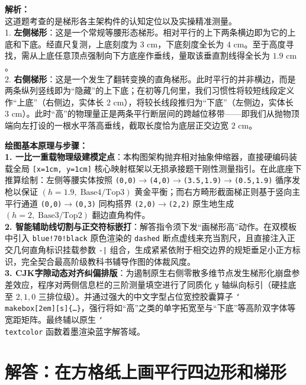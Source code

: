 {\small\color{gray}
\textbf{解析：}\\
这道题考查的是梯形各主架构件的认知定位以及实操精准测量。\\
1. \textbf{左侧梯形}：这是一个常规等腰形态梯形。相对平行的上下两条横边即为它的上底和下底。经直尺复测，上底刻度为 $3\text{ cm}$，下底刻度全长为 $4\text{ cm}$。至于高度寻找，需从上底任意顶点强制向下方底座作垂线，量取该垂直割线得全长为 $1.9\text{ cm}$。\\
2. \textbf{右侧梯形}：这是一个发生了翻转变换的直角梯形。此时平行的并非横边，而是两条纵列竖线即为“隐藏”的上下底；在初等几何里，我们习惯性将较短线段定义作“上底”（右侧边，实体长 $2\text{ cm}$），将较长线段推归为“下底”（左侧边，实体长 $3\text{ cm}$）。此时“高”的物理量正是两条平行断层间的跨越位移带——即我们从抛物顶端向左打设的一根水平落高垂线，截取长度恰为底层正交边宽 $2\text{ cm}$。
}

\vspace{0.6cm}

{\small\color{blue!70!black}
\textbf{绘图基本原理与步骤：}\\
\textbf{1. 一比一重载物理级建模定点}：本构图架构抛弃相对抽象伸缩器，直接硬编码装载全局 \texttt{[x=1cm, y=1cm]} 核心映射框架以无损承接题干刚性测量指引。在此底座下推算绘制：左侧等腰实体按照 \texttt{(0,0)$\to$(4,0)$\to$(3.5,1.9)$\to$(0.5,1.9)} 循序发枪以保证 $(h{=}1.9,\; \text{Base}4 / \text{Top}3)$ 黄金平衡；而右方畸形截面梯正则基于竖向主平行通道 \texttt{(0,0)$\to$(0,3)} 同构搭界 \texttt{(2,0)$\to$(2,2)} 原生地生成 $(h{=}2,\; \text{Base}3 / \text{Top}2)$ 翻边直角构件。\\
\textbf{2. 智能辅助线切割与正交符标嵌打}：解答指令须下发“画梯形高”动作。在双模板中引入 \texttt{blue!70!black} 原色渲染的 \texttt{dashed} 断点虚线来充当割尺，且直接注入正交几何直角标识挂载参数 \texttt{-|} 组合，生成紧紧依附于相交边界的规矩垂足小正方标识，完全契合最高阶级教科书辅导作图的体裁风度。\\
\textbf{3. CJK字隙动态对齐纠偏排版}：为遏制原生右侧零散多维节点发生梯形化崩盘参差效应，程序对两侧信息栏的三阶测量填空进行了同质化 \texttt{y} 轴纵向标引（硬挂底至 $2, 1, 0$ 三排位级）。并通过强大的中文字型占位宽控胶囊算子 \texttt{\char`\\makebox[2em][s]\{\dots\}}，强行将如“高”之类的单字拓宽至与“下底”等高阶双字体等宽距矩阵。最终辅以原生 \texttt{\char`\\textcolor} 函数着墨渲染蓝字解答域。
}


\newpage



\section{解答：在方格纸上画平行四边形和梯形}

